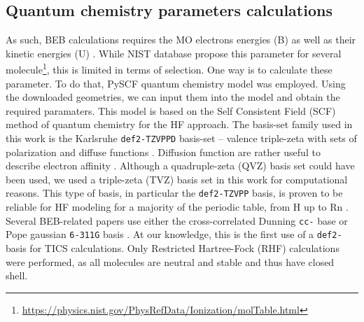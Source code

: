 \documentclass[twocolumn, a4paper, twoside,10pt]{scrartcl}
\begin{document}
\subsection{Quantum chemistry parameters calculations}\label{sec:quantum}
As such, BEB calculations requires the MO electrons energies (B) as well as their kinetic energies (U) . While NIST database propose this parameter for several molecule\footnote{\url{https://physics.nist.gov/PhysRefData/Ionization/molTable.html}}, this is limited in terms of selection. One way is to calculate these parameter. To do that, PySCF quantum chemistry model \citep{sunPythonbasedSimulationsChemistry2017}  was employed. Using the downloaded geometries, we can input them into the model and obtain the required paramaters. This model is based on the Self Consistent Field (SCF) method of quantum chemistry for the HF approach. The basis-set family used in this work is the Karlsruhe \verb+def2-TZVPPD+ basis-set -- valence triple-zeta with sets of polarization and diffuse functions \citep{weigendBalancedBasisSets2005,rappoportPropertyoptimizedGaussianBasis2010}. Diffusion function are rather useful to describe electron affinity \citep{morrisonLimitsAccuracyExtended2025}. Although a quadruple-zeta (QVZ) basis set could have been used, we used a triple-zeta (TVZ) basis set in this work for computational reasons. This type of basis, in particular the \verb|def2-TZVPP| basis, is proven to be reliable for HF modeling for a majority of the periodic table, from H up to Rn \citep{hellwegDevelopmentNewAuxiliary2015,zhengMinimallyAugmentedKarlsruhe2011}. Several BEB-related papers use either the cross-correlated Dunning \citet{dunningGaussianBasisSets1989} \verb|cc-| base \citep{gachesAstrochemistryLowenergyElectron2024,kumarElectronIonizationCross2014} or Pope \citep{krishnanSelfconsistentMolecularOrbital1980} gaussian \verb|6-311G| basis \citep{aliElectronimpactTotalIonization1997, hwangNewModelElectronimpact1996, scottElectronImpactIonizationCross2005}. At our knowledge, this is the first use of a \verb|def2-| basis for TICS calculations. Only Restricted Hartree-Fock (RHF) calculations were performed, as all molecules are neutral and stable and thus have closed shell.
\end{document}

